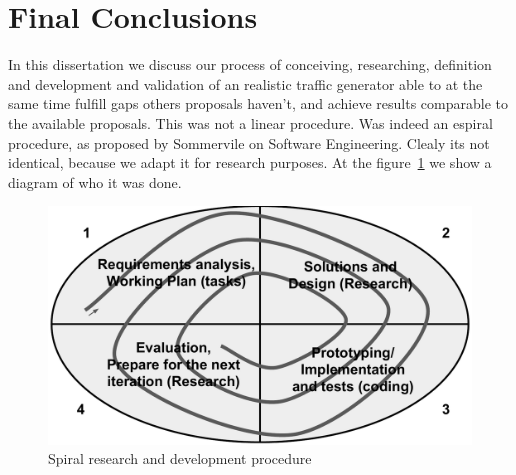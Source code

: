 



\section{Final Conclusions}


In this dissertation we discuss our process of conceiving, researching, definition and development and validation of an realistic traffic generator able to at the same time fulfill gaps others proposals haven't, and achieve results comparable to the available proposals. This was not a linear procedure. Was indeed an espiral procedure, as proposed by Sommervile on Software Engineering\cite{sommerville}. Clealy its not identical, because we adapt it for research purposes. At the figure~\ref{fig:spiral} we show a diagram of who  it was done. 

\begin{figure}[!ht]
	\centering
	\includegraphics[scale=0.4]{figures/ch6/spiral}
	\caption{Spiral research and development procedure}
	\label{fig:spiral}
\end{figure}

